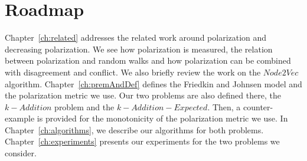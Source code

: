 \section{Roadmap}
\label{sec:roadmap}

Chapter~\ref{ch:related} addresses the related work around polarization and decreasing polarization. We see how polarization is measured, the relation between polarization and random walks and how polarization can be combined with disagreement and conflict. We also briefly review the work on  the $Node2Vec$ algorithm. Chapter~\ref{ch:premAndDef} defines the Friedkin and Johnsen model and the polarization metric we use. Our two problems are also defined there, the $k-Addition$ problem and the $k-Addition-Expected$. Then, a counter-example is provided for the monotonicity of the polarization metric we use. In Chapter~\ref{ch:algorithms},  we describe our algorithms for both problems. Chapter~\ref{ch:experiments} presents our experiments for the two problems we consider.




